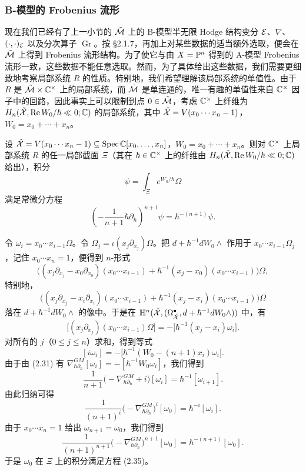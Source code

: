 \subsubsection{B-模型的 Frobenius 流形}现在我们已经有了上一小节的 $\tilde{\mathcal{M}}$ 上的 B-模型半无限 Hodge 结构变分 $\mathcal{E}$、$\nabla$、$(\cdot,\cdot)_{\mathcal{E}}$ 以及分次算子 $\operatorname{Gr}$。按 §2.1.7，再加上对某些数据的适当额外选取，便会在 $\tilde{\mathcal{M}}$ 上得到 Frobenius 流形结构。为了使它与由 $X=\mathbb{P}^n$ 得到的 A-模型 Frobenius 流形一致，这些数据不能任意选取。然而，为了具体给出这些数据，我们需要更细致地考察局部系统 $R$ 的性质。特别地，我们希望理解该局部系统的单值性。由于 $R$ 是 $\tilde{\mathcal{M}}\times\mathbb{C}^\times$ 上的局部系统，而 $\tilde{\mathcal{M}}$ 是单连通的，唯一有趣的单值性来自 $\mathbb{C}^\times$ 因子中的回路，因此事实上可以限制到点 $0\in\tilde{\mathcal{M}}$，考虑 $\mathbb{C}^\times$ 上纤维为 $H_n(\check{\mathcal{X}},\operatorname{Re} W_0/\hbar\ll0;\mathbb{C})$ 的局部系统，其中 $\check{\mathcal{X}}=V(x_0\cdots x_n-1)$，$W_0=x_0+\cdots+x_n$。

\begin{proposition}
设 $\check{\mathcal{X}}=V(x_0\cdots x_n-1)\subseteq\operatorname{Spec}\mathbb{C}[x_0,\ldots,x_n]$，$W_0=x_0+\cdots+x_n$。则对 $\mathbb{C}^\times$ 上局部系统 $R$ 的任一局部截面 $\Xi$（其在 $\hbar\in\mathbb{C}^\times$ 上的纤维由 $H_n(\check{\mathcal{X}},\operatorname{Re} W_0/\hbar\ll0;\mathbb{C})$ 给出），积分
\[
  \psi=\int_\Xi e^{W_0/\hbar}\Omega
\]
满足常微分方程
\begin{equation}
  \left(-\frac{1}{n+1}\hbar\partial_\hbar\right)^{n+1}\psi=\hbar^{-(n+1)}\psi. \tag{2.35}
\end{equation}
\end{proposition}

令 $\omega_i=x_0\cdots x_{i-1}\Omega$。令 $\Omega_j=\iota(x_j\partial_{x_j})\Omega$。把 $d+\hbar^{-1}dW_0\wedge$ 作用于 $x_0\cdots x_{i-1}\Omega_j$，记住 $x_0\cdots x_n=1$，便得到 $n$-形式
\[
  \bigl((x_j\partial_{x_j}-x_0\partial_{x_0})(x_0\cdots x_{i-1})
  +\hbar^{-1}(x_j-x_0)(x_0\cdots x_{i-1})\bigr)\Omega,
\]
特别地，
\[
  \bigl((x_j\partial_{x_j}-x_i\partial_{x_i})(x_0\cdots x_{i-1})
  +\hbar^{-1}(x_j-x_i)(x_0\cdots x_{i-1})\bigr)\Omega
\]
落在 $d+\hbar^{-1}dW_0\wedge$ 的像中。于是在 $\mathbb{H}^n(\check{\mathcal{X}},(\Omega^{\bullet}_{\check{\mathcal{X}}},d+\hbar^{-1}dW_0\wedge))$ 中，有
\[
  \bigl[(x_j\partial_{x_j})(x_0\cdots x_{i-1})\Omega\bigr]
  =-\bigl[\hbar^{-1}(x_j-x_i)\omega_i\bigr].
\]
对所有的 $j$（$0\le j\le n$）求和，得到等式
\[
  [i\omega_i]=-\bigl[\hbar^{-1}(W_0-(n+1)x_i)\omega_i\bigr].
\]
由于由 (2.31) 有 $\nabla^{GM}_{\hbar\partial_\hbar}[\omega_i]=-[\hbar^{-1}W_0\omega_i]$，我们得到
\[
  \frac{1}{n+1}\bigl(-\nabla^{GM}_{\hbar\partial_\hbar}+i\bigr)[\omega_i]
  =\hbar^{-1}[\omega_{i+1}].
\]
由此归纳可得
\[
  \frac{1}{(n+1)^{i}}\bigl(-\nabla^{GM}_{\hbar\partial_\hbar}\bigr)^{i}[\omega_0]
  =\hbar^{-i}[\omega_i].
\]
由于 $x_0\cdots x_n=1$ 给出 $\omega_{n+1}=\omega_0$，我们得到
\[
  \frac{1}{(n+1)^{n+1}}\bigl(-\nabla^{GM}_{\hbar\partial_\hbar}\bigr)^{n+1}[\omega_0]
  =\hbar^{-(n+1)}[\omega_0].
\]
于是 $\omega_0$ 在 $\Xi$ 上的积分满足方程 (2.35)。

